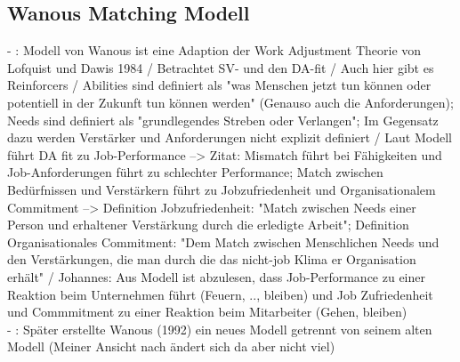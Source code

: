 \subsection{Wanous Matching Modell}
\label{ch:notizen:rekcruitingUndSelektion:wanous}
- \cite[S. 34f.]{edwards:2008}: Modell von Wanous ist eine Adaption der Work Adjustment Theorie von Lofquist und Dawis 1984 / Betrachtet SV- und den DA-fit / Auch hier gibt es Reinforcers / Abilities sind definiert als "was Menschen jetzt tun können oder potentiell in der Zukunft tun können werden" (Genauso auch die Anforderungen); Needs sind definiert als "grundlegendes Streben oder Verlangen"; Im Gegensatz dazu werden Verstärker und Anforderungen nicht explizit definiert / Laut Modell führt DA fit zu Job-Performance --> Zitat: Mismatch führt bei Fähigkeiten und Job-Anforderungen führt zu schlechter Performance; Match zwischen Bedürfnissen und Verstärkern führt zu Jobzufriedenheit und Organisationalem Commitment --> Definition Jobzufriedenheit: "Match zwischen Needs einer Person und erhaltener Verstärkung durch die erledigte Arbeit"; Definition Organisationales Commitment: "Dem Match zwischen Menschlichen Needs und den Verstärkungen, die man durch die das nicht-job Klima er Organisation erhält" / Johannes: Aus Modell ist abzulesen, dass Job-Performance zu einer Reaktion beim Unternehmen führt (Feuern, .., bleiben) und Job Zufriedenheit und Commmitment zu einer Reaktion beim Mitarbeiter (Gehen, bleiben) \\
- \cite[S. 35]{edwards:2008}: Später erstellte Wanous (1992) ein neues Modell getrennt von seinem alten Modell (Meiner Ansicht nach ändert sich da aber nicht viel)

